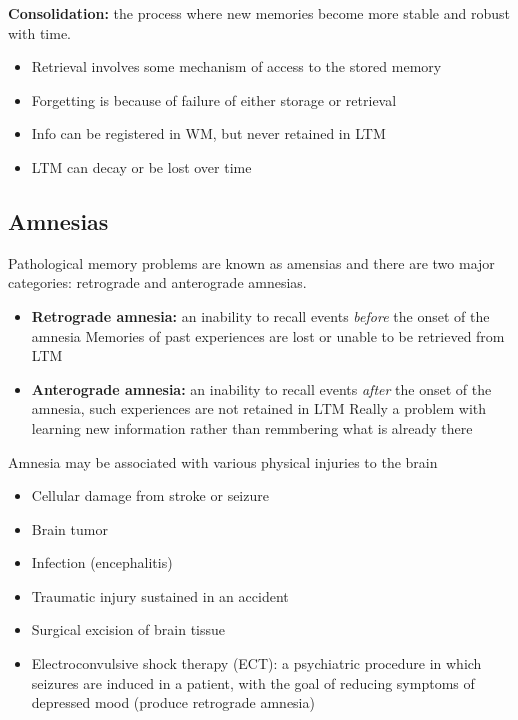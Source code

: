 \documentclass{article}
\begin{document}
\noindent \textbf{Consolidation:} the process where new memories become more stable and robust with time. 

\begin{itemize}
    \item Retrieval involves some mechanism of access to the stored memory 
    \item Forgetting is because of failure of either storage or retrieval 
    \item Info can be registered in WM, but never retained in LTM
    \item LTM can decay or be lost over time
\end{itemize}

\subsection{Amnesias}
Pathological memory problems are known as amensias and there are two major categories: retrograde and anterograde amnesias. 

\begin{itemize}
    \item \textbf{Retrograde amnesia:} an inability to recall events \textit{before} the onset of the amnesia
        \subitem Memories of past experiences are lost or unable to be retrieved from LTM
    \item \textbf{Anterograde amnesia:} an inability to recall events \textit{after} the onset of the amnesia, such experiences are not retained in LTM  
        \subitem Really a problem with learning new information rather than remmbering what is already there
\end{itemize}

\noindent Amnesia may be associated with various physical injuries to the brain 
\begin{itemize}
    \item Cellular damage from stroke or seizure
    \item Brain tumor
    \item Infection (encephalitis) 
    \item Traumatic injury sustained in an accident
    \item Surgical excision of brain tissue
    \item Electroconvulsive shock therapy (ECT): a psychiatric procedure in which seizures are induced in a  patient, with the goal of reducing symptoms of depressed mood (produce retrograde amnesia)
\end{itemize}
\end{document}
